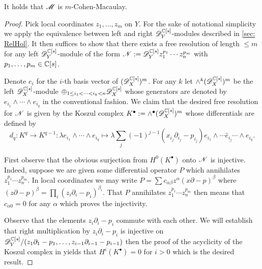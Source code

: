 \begin{proposition}\label{prop: CM}
  It holds that $\mathscr{M}$ is $m$-Cohen-Macaulay.
\end{proposition}
\begin{proof}
  Pick local coordinates $z_1,\ldots, z_m$ on $Y$.
  For the sake of notational simplicity we apply the equivalence between left and right $\mathscr{D}_Y^{\mathbb{C}[s]}$-modules described in \cref{sec: RelHol}.
  It then suffices to show that there exists a free resolution of length $\leq m$ for any left $\mathscr{D}_Y^{\mathbb{C}[s]}$-module of the form $\mathscr{N}:= \mathscr{D}_Y^{\mathbb{C}[s]}z_1^{p_1}\cdots z_n^{p_m}$ with $p_1,\ldots, p_m\in \mathbb{C}[s]$.

  Denote $e_i$ for the $i$-th basis vector of $(\mathscr{D}_X^{\mathbb{C}[s]})^m$.
  For any $k$ let $\wedge^k (\mathscr{D}_X^{\mathbb{C}[s]})^m$ be the left $\mathscr{D}_X^{\mathbb{C}[s]}$-module $\oplus_{1\leq i_1 < \cdots < i_k <n}\mathscr{D}_X^{\mathbb{C}[s]}$ whose generators are denoted by $e_{i_1}\wedge \cdots \wedge e_{i_q}$ in the conventional fashion.
  We claim that the desired free resolution for $\mathscr{N}$ is given by the Koszul complex $K^\bullet := \wedge^\bullet (\mathscr{D}_X^{\mathbb{C}[s]})^m$ whose differentials are defined by
  $$d_q :K^q \to K^{q-1}:\lambda e_{i_1}\wedge \cdots \wedge e_{i_q} \mapsto \lambda \sum_{j} (-1)^{j-1} (x_{i_j} \partial_{i_j} - p_{i_j})e_{i_1}\wedge \cdots \hat{e}_{i_j} \cdots \wedge e_{i_q}.$$

  First observe that the obvious surjection from $H^0(K^\bullet)$ onto $\mathscr{N}$ is injective.
  Indeed, suppose we are given some differential operator $P$ which annihilates $z_1^{p_1}\cdots z_n^{p_m}$.
  In local coordinates we may write $P = \sum c_{\alpha \beta} z^\alpha (x\partial - p)^\beta$ where $(z\partial - p)^\beta = \prod_i (z_i \partial_i - p_i)^{\beta_i}$.
  That $P$ annihilates $z_1^{p_1}\cdots z_n^{p_m}$ then means that $c_{\alpha 0}=0$ for any $\alpha$ which proves the injectivity.

  Observe that the elements $z_i \partial_i - p_i$ commute with each other.
  We will establish that right multiplication by $z_i\partial_i - p_i$ is injective on $\mathscr{D}_Y^{\mathbb{C}[s]}/(z_1\partial_1 - p_1,\ldots, z_{i-1}\partial_{i-1} - p_{i-1} )$ then the proof of the acyclicity of the Koszul complex in \cite[Corollary 4.5.4]{weibel1995introduction} yields that $H^i(K^\bullet)= 0$ for $i>0$ which is the desired result.


\end{proof}
